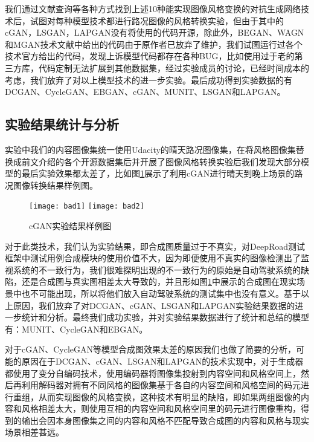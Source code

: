 我们通过文献查询等各种方式找到上述10种能实现图像风格变换的对抗生成网络技术后，试图对每种模型技术都进行路况图像的风格转换实验，但由于其中的cGAN，LSGAN，LAPGAN没有将使用的代码开源，除此外，BEGAN、WAGN和MGAN技术文献中给出的代码由于原作者已放弃了维护，我们试图运行过各个技术官方给出的代码，发现上诉模型代码都存在各种BUG，比如使用过于老的第三方库，代码定制无法扩展到其他数据集，经过实验成员的讨论，已经时间成本的考虑，我们放弃了对以上模型技术的进一步实验。最后成功得到实验数据的有DCGAN、CycleGAN、EBGAN、cGAN、MUNIT、LSGAN和LAPGAN。

\subsection{实验结果统计与分析}

实验中我们的内容图像集统一使用Udacity的晴天路况图像集，在将风格图像集替换成前文介绍的各个开源数据集后并开展了图像风格转换实验后我们发现大部分模型的最后实验效果都太差了，比如图\ref{bad-res}展示了利用cGAN进行晴天到晚上场景的路况图像转换结果样例图。

\begin{figure}[h]
    \centering
    \texttt{[image: bad1]}
    \texttt{[image: bad2]}
    \caption{cGAN实验结果样例图}
    \label{bad-res}
\end{figure}

对于此类技术，我们认为实验结果，即合成图质量过于不真实，对DeepRoad测试框架中测试用例合成模块的使用价值不大，因为即便使用不真实的图像检测出了监视系统的不一致行为，我们很难探明出现的不一致行为的原始是自动驾驶系统的缺陷，还是合成图与真实图相差太大导致的，并且形如图\ref{bad-res}中展示的合成图在现实场景中也不可能出现，所以将他们放入自动驾驶系统的测试集中也没有意义。基于以上原因，我们放弃了对DCGAN、cGAN、LSGAN和LAPGAN实验结果数据的进一步统计和分析。最终我们成功实验，并对实验结果数据进行了统计和总结的模型有：MUNIT、CycleGAN和EBGAN。

对于cGAN、CycleGAN等模型合成图效果太差的原因我们也做了简要的分析，可能的原因在于DCGAN、cGAN、LSGAN和LAPGAN的技术实现中，对于生成器都使用了变分自编码技术，使用编码器将图像集投射到内容空间和风格空间上，然后再利用解码器对拥有不同风格的图像集基于各自的内容空间和风格空间的码元进行重组，从而实现图像的风格变换，这种技术有明显的缺陷，即如果两组图像的内容和风格相差太大，则使用互相的内容空间和风格空间里的码元进行图像重构，得到的输出会因本身图像集之间的内容和风格不匹配导致合成图的内容和风格与现实场景相差甚远。